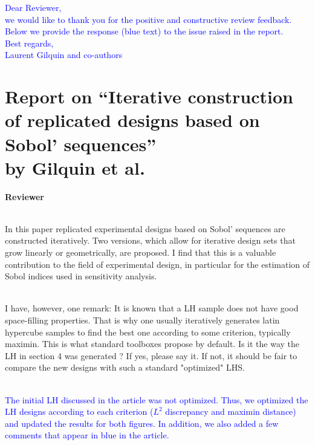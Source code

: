 \documentclass[10pt,a4paper]{article}
\begin{document}
\begin{flushleft}

\textcolor{blue}{Dear Reviewer,\\
we would like to thank you for the positive and constructive review feedback. Below we provide the response (blue text) to the issue raised in the report.\\
Best regards,\\
Laurent Gilquin and co-authors}

\section*{Report on ``Iterative construction of replicated designs based on Sobol' sequences''\\ \small{by Gilquin et al.}}

\textbf{Reviewer}\\\

In this paper replicated experimental designs based on Sobol' sequences are constructed iteratively. Two versions, which allow for iterative design sets that grow linearly or geometrically, are proposed. I find that this is a valuable contribution to the field of experimental design, in particular for the estimation of Sobol indices used in sensitivity analysis.\\\

I have, however, one remark: It is known that a LH sample does not have good space-filling properties. That is why one usually iteratively generates latin hypercube samples to find the best one according to some criterion, typically maximin. This is what standard toolboxes propose by default. Is it the way the LH in section 4 was generated ? If yes, please say it. If not, it should be fair to compare the new designs with such a standard "optimized" LHS.\\\

\textcolor{blue}{The initial LH discussed in the article was not optimized. Thus, we optimized the LH designs according to each criterion ($L^2$ discrepancy and maximin distance) and updated the results for both figures. In addition, we also added a few comments that appear in blue in the article.}

\end{flushleft}
\end{document}
